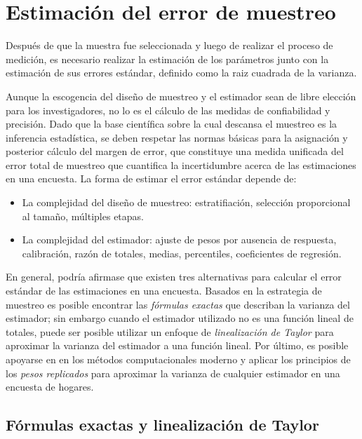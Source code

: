 \documentclass[
  10pt,
  spanish,
]{book}
\providecommand{\tightlist}{%
  \setlength{\itemsep}{0pt}\setlength{\parskip}{0pt}}
\begin{document}
\hypertarget{estimaciuxf3n-del-error-de-muestreo}{%
\chapter{Estimación del error de muestreo}\label{estimaciuxf3n-del-error-de-muestreo}}

Después de que la muestra fue seleccionada y luego de realizar el proceso de medición, es necesario realizar la estimación de los parámetros junto con la estimación de sus errores estándar, definido como la raiz cuadrada de la varianza.

Aunque la escogencia del diseño de muestreo y el estimador sean de libre elección para los investigadores, no lo es el cálculo de las medidas de confiabilidad y precisión. Dado que la base científica sobre la cual descansa el muestreo es la inferencia estadística, se deben respetar las normas básicas para la asignación y posterior cálculo del margen de error, que constituye una medida unificada del error total de muestreo que cuantifica la incertidumbre acerca de las estimaciones en una encuesta. La forma de estimar el error estándar depende de:

\begin{itemize}
\tightlist
\item
  La complejidad del diseño de muestreo: estratifiación, selección proporcional al tamaño, múltiples etapas.
\item
  La complejidad del estimador: ajuste de pesos por ausencia de respuesta, calibración, razón de totales, medias, percentiles, coeficientes de regresión.
\end{itemize}

En general, podría afirmase que existen tres alternativas para calcular el error estándar de las estimaciones en una encuesta. Basados en la estrategia de muestreo es posible encontrar las \emph{fórmulas exactas} que describan la varianza del estimador; sin embargo cuando el estimador utilizado no es una función lineal de totales, puede ser posible utilizar un enfoque de \emph{linealización de Taylor} para aproximar la varianza del estimador a una función lineal. Por último, es posible apoyarse en en los métodos computacionales moderno y aplicar los principios de los \emph{pesos replicados} para aproximar la varianza de cualquier estimador en una encuesta de hogares.

\hypertarget{fuxf3rmulas-exactas-y-linealizaciuxf3n-de-taylor}{%
\section{Fórmulas exactas y linealización de Taylor}\label{fuxf3rmulas-exactas-y-linealizaciuxf3n-de-taylor}}
\end{document}
